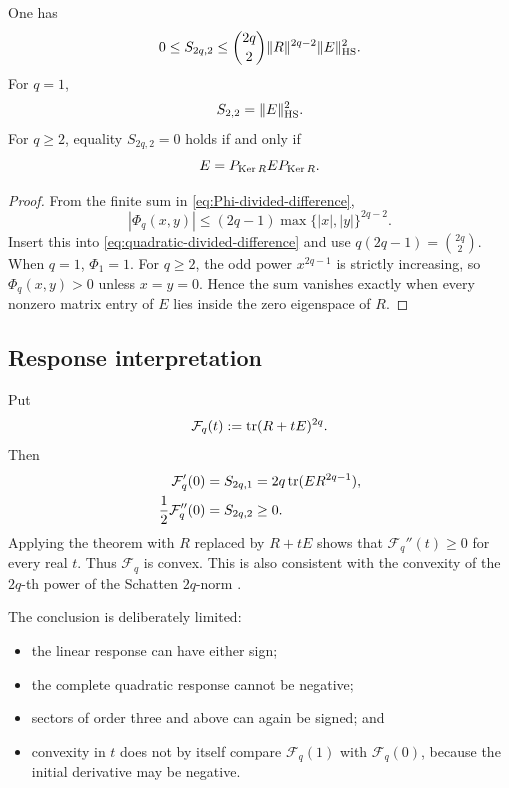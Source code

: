 \begin{corollary}
\label{cor:quadratic-upper}
One has
\begin{equation}
 0\le S_{2q,2}
 \le
 \binom{2q}{2}
 \|R\|^{2q-2}\|E\|_{\rm HS}^2.
 \label{eq:quadratic-upper}
\end{equation}
For \(q=1\),
\[
 S_{2,2}=\|E\|_{\rm HS}^2.
\]
For \(q\ge2\), equality \(S_{2q,2}=0\) holds if and only if
\begin{equation}
 E=P_{\operatorname{Ker} R}EP_{\operatorname{Ker} R}.
 \label{eq:quadratic-zero-characterization}
\end{equation}
\end{corollary}

\begin{proof}
From the finite sum in \eqref{eq:Phi-divided-difference},
\[
 |\Phi_q(x,y)|
 \le(2q-1)\max\{|x|,|y|\}^{2q-2}.
\]
Insert this into \eqref{eq:quadratic-divided-difference} and use
\(q(2q-1)=\binom{2q}{2}\).  When \(q=1\), \(\Phi_1=1\).
For \(q\ge2\), the odd power \(x^{2q-1}\) is strictly increasing, so
\(\Phi_q(x,y)>0\) unless \(x=y=0\).  Hence the sum vanishes exactly when
every nonzero matrix entry of \(E\) lies inside the zero eigenspace of
\(R\).
\end{proof}

\subsection{Response interpretation}

Put
\begin{equation}
 \mathcal F_q(t):=\operatorname{tr}(R+tE)^{2q}.
 \label{eq:moment-response-function}
\end{equation}
Then
\begin{align}
 \mathcal F_q'(0)&=S_{2q,1}
 =2q\operatorname{tr}(ER^{2q-1}),
 \label{eq:first-response}\\
 \frac12\mathcal F_q''(0)&=S_{2q,2}\ge0.
 \label{eq:second-response}
\end{align}
Applying the theorem with \(R\) replaced by \(R+tE\) shows that
\(\mathcal F_q''(t)\ge0\) for every real \(t\).  Thus
\(\mathcal F_q\) is convex.  This is also consistent with the convexity of
the \(2q\)-th power of the Schatten \(2q\)-norm
\citep{Bhatia1997,HornJohnson2013}.

The conclusion is deliberately limited:
\begin{itemize}
 \item the linear response can have either sign;
 \item the complete quadratic response cannot be negative;
 \item sectors of order three and above can again be signed; and
 \item convexity in \(t\) does not by itself compare
       \(\mathcal F_q(1)\) with \(\mathcal F_q(0)\), because the initial
       derivative may be negative.
\end{itemize}

